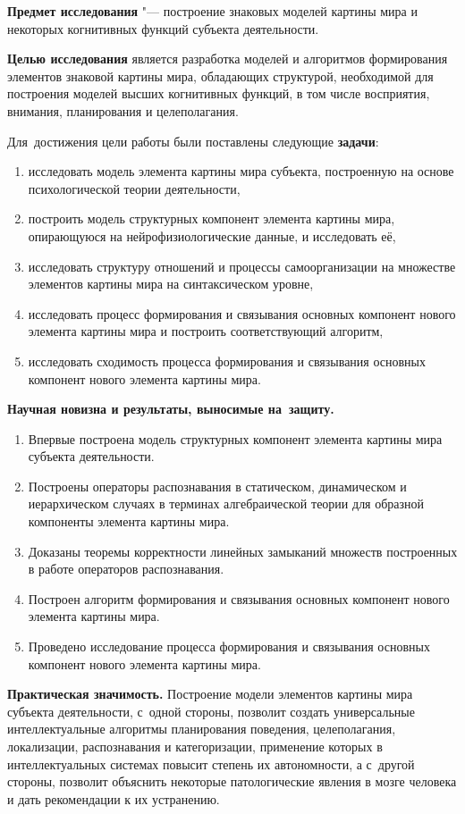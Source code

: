 \textbf{Предмет исследования} "--- построение знаковых моделей картины мира и некоторых когнитивных функций субъекта деятельности.

\textbf{Целью исследования} является разработка моделей и алгоритмов формирования элементов знаковой картины мира, обладающих структурой, необходимой для построения моделей высших когнитивных функций, в том числе восприятия, внимания, планирования и целеполагания.

Для~достижения цели работы были поставлены следующие \textbf{задачи}:
\begin{enumerate}
  \item исследовать модель элемента картины мира субъекта, построенную на основе психологической теории деятельности,
  \item построить модель структурных компонент элемента картины мира, опирающуюся на нейрофизиологические данные, и исследовать её,
  \item исследовать структуру отношений и процессы самоорганизации на множестве элементов картины мира на синтаксическом уровне,
  \item исследовать процесс формирования и связывания основных компонент нового элемента картины мира и построить соответствующий алгоритм,
  \item исследовать сходимость процесса формирования и связывания основных компонент нового элемента картины мира.
\end{enumerate}

\textbf{Научная новизна и результаты, выносимые на~защиту.}
\begin{enumerate}
	\renewcommand\labelenumi{\theenumi.}
  \item Впервые построена модель структурных компонент элемента картины мира субъекта деятельности.
  \item Построены операторы распознавания в статическом, динамическом и иерархическом случаях в терминах алгебраической теории для образной компоненты элемента картины мира.
  \item Доказаны теоремы корректности линейных замыканий множеств построенных в работе операторов распознавания.
  \item Построен алгоритм формирования и связывания основных компонент нового элемента картины мира.
  \item Проведено исследование процесса формирования и связывания основных компонент нового элемента картины мира.
\end{enumerate}

\textbf{Практическая значимость.} Построение модели элементов картины мира субъекта деятельности, с~одной стороны, позволит создать универсальные интеллектуальные алгоритмы планирования поведения, целеполагания, локализации, распознавания и категоризации, применение которых в интеллектуальных системах повысит степень их автономности, а с~другой стороны, позволит объяснить некоторые патологические явления в мозге человека и дать рекомендации к их устранению.


